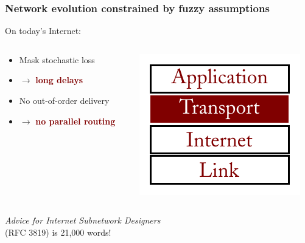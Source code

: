 \documentclass[svgnames]{beamer}
\begin{document}
\begin{frame}
\frametitle{Network evolution constrained by fuzzy assumptions}

\Large

On today's Internet:

\begin{columns}

\begin{column}{0.66\textwidth}

\begin{itemize}
\item Mask stochastic loss
\item[] \hspace{1 cm}$\rightarrow$ {\bf \textcolor{Maroon}{long delays}}

\item No out-of-order delivery
\item[] \hspace{1 cm}$\rightarrow$ {\bf \textcolor{Maroon}{no parallel routing}}
\end{itemize}

\end{column}

\begin{column}{0.33\textwidth}

\includegraphics[width=\textwidth]{transport.pdf}

\end{column}

\end{columns}

\vspace{\baselineskip}

{\it Advice for Internet Subnetwork Designers}\\ (RFC 3819) is 21,000 words!

\end{frame}
\end{document}
